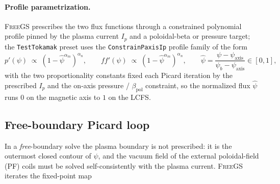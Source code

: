 \paragraph{Profile parametrization.}
\textsc{FreeGS} prescribes the two flux functions through a constrained
polynomial profile pinned by the plasma current $I_p$ and a poloidal-beta
or pressure target; the \texttt{TestTokamak} preset uses the
\texttt{ConstrainPaxisIp} profile family of the form
\begin{equation}
p'(\psi)\;\propto\;(1-\hat\psi^{\alpha_m})^{\alpha_n},
\qquad
ff'(\psi)\;\propto\;(1-\hat\psi^{\alpha_m})^{\alpha_n},
\qquad
\hat\psi=\frac{\psi-\psi_{\text{axis}}}{\psi_b-\psi_{\text{axis}}}\in[0,1],
\label{eq:profiles}
\end{equation}
with the two proportionality constants fixed each Picard iteration by
the prescribed $I_p$ and the on-axis pressure / $\beta_{\text{pol}}$
constraint, so the normalized flux $\hat\psi$ runs $0$ on the magnetic
axis to $1$ on the LCFS.

\subsection{Free-boundary Picard loop}
\label{app:picard}

In a \emph{free}-boundary solve the plasma boundary is not prescribed:
it is the outermost closed contour of $\psi$, and the vacuum field of the
external poloidal-field (PF) coils must be solved self-consistently with
the plasma current. \textsc{FreeGS} iterates the fixed-point map

